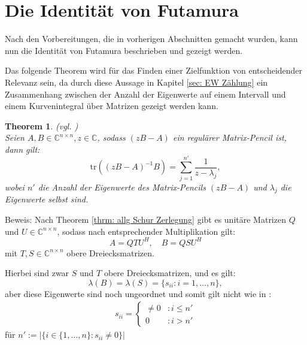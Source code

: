 \documentclass[a4paper,12pt]{report}
\newcommand{\C}{\mathbb C}
\newcommand{\tr}{\text{tr}}
\newcommand{\Cnn}{\C^{n\times n}}
\newcommand{\inv}{^{-1}}
\newcommand{\1}{\mathds{1}}
\theoremstyle{plain} %
\newtheorem{theorem}{Theorem}
\theoremstyle{definition} %
\theoremstyle{remark}
\begin{document}
      \section{Die Identität von Futamura}
      \label{sec: Futamura}

            Nach den Vorbereitungen, die in vorherigen Abschnitten gemacht wurden, kann nun die Identität von Futamura beschrieben und gezeigt werden.

            Das folgende Theorem wird für das Finden einer Zielfunktion von entscheidender Relevanz sein,
            da durch diese Aussage in Kapitel \ref{sec: EW Zählung} ein Zusammenhang zwischen der Anzahl der Eigenwerte auf einem Intervall und einem Kurvenintegral über Matrizen gezeigt werden kann.

            \begin{theorem}
                  \label{thrm: IdentitätFutamura}(vgl. \cite[S. 127]{grundlageFutamura})\\
                  Seien $A, B\in\Cnn, z\in \C$, sodass $(zB-A)$ ein regulärer Matrix-Pencil ist, dann gilt:
                  \begin{equation}
                        \label{eqn: Resultat_Futamura}
                        \tr((zB-A)\inv B) = \sum_{j=1}^{n'} \frac{1}{z-\lambda_j},
                  \end{equation}
                  wobei $n'$ die Anzahl der Eigenwerte des Matrix-Pencils $(zB-A)$ und $\lambda_j$ die Eigenwerte selbst sind.
            \end{theorem}
            Beweis:
            Nach Theorem \ref{thrm: allg Schur Zerlegung} gibt es unitäre Matrizen $Q$ und $U\in\Cnn$, sodass nach entsprechender Multiplikation gilt:
            $$A=QTU^H,\quad B=QSU^H$$
            mit $T,S\in\Cnn$ obere Dreiecksmatrizen.
            
            Hierbei sind zwar $S$ und $T$ obere Dreiecksmatrizen, und es gilt:
            $$\lambda(B)=\lambda(S) = \{s_{ii}:i=1,\dots,n\},$$
            aber diese Eigenwerte sind noch ungeordnet und somit gilt nicht wie in \cite{grundlageFutamura}:
            \begin{align*}
                  s_{ii} = \begin{cases}
                        \ne 0 & : i\le n'\\
                        0 & : i>n'
                  \end{cases}
            \end{align*}
            für $n':=|\{i\in\{1,\dots,n\}: s_{ii}\ne 0\}|$
\end{document}
